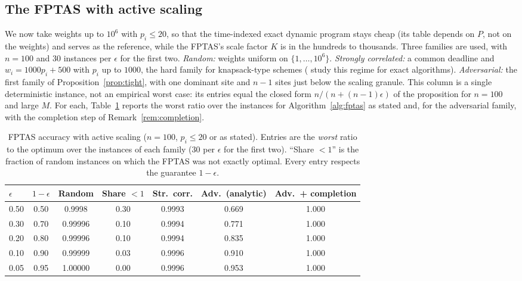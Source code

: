 \documentclass[pdflatex,sn-mathphys-ay]{sn-jnl}
\theoremstyle{thmstyleone}
\theoremstyle{thmstyletwo}
\theoremstyle{thmstylethree}
\begin{document}
\subsection{The FPTAS with active scaling}\label{sec:scaling}

We now take weights up to $10^6$ with $p_i\le20$, so that the
time-indexed exact dynamic program stays cheap (its table depends on
$P$, not on the weights) and serves as the reference, while the
FPTAS's scale factor $K$ is in the hundreds to thousands. Three
families are used, with $n=100$ and $30$ instances per $\epsilon$ for
the first two. \emph{Random:} weights uniform on $\{1,\dots,10^6\}$.
\emph{Strongly correlated:} a common deadline and $w_i=1000p_i+500$ with
$p_i$ up to $1000$, the hard family for knapsack-type schemes
(\citealp{hejl2022} study this regime for exact algorithms).
\emph{Adversarial:} the first family of Proposition~\ref{prop:tight}, with
one dominant site and $n-1$ sites just below the scaling granule. This
column is a single deterministic instance, not an empirical worst case: its
entries equal the closed form $n/(n+(n-1)\epsilon)$ of the proposition for
$n=100$ and large $M$. For each, Table~\ref{tab:scaling} reports the worst ratio over the instances
for Algorithm~\ref{alg:fptas} as stated and, for the adversarial family,
with the completion step of Remark~\ref{rem:completion}.

\begin{table}[h]
\caption{FPTAS accuracy with active scaling ($n=100$, $p_i\le20$ or as
stated). Entries are the \emph{worst} ratio to the optimum over the
instances of each family ($30$ per $\epsilon$ for the first two). ``Share $<1$''
is the fraction of random instances on which the FPTAS was not exactly
optimal. Every entry respects the guarantee $1-\epsilon$.}\label{tab:scaling}
\small
\begin{tabular}{@{}lcccccc@{}}
\toprule
$\epsilon$ & $1-\epsilon$ & Random & Share $<1$ & Str.\ corr. & Adv.\ (analytic) & Adv.\ + completion \\
\midrule
0.50 & 0.50 & 0.9998 & 0.30 & 0.9993 & 0.669 & 1.000 \\
0.30 & 0.70 & 0.99996 & 0.10 & 0.9994 & 0.771 & 1.000 \\
0.20 & 0.80 & 0.99996 & 0.10 & 0.9994 & 0.835 & 1.000 \\
0.10 & 0.90 & 0.99999 & 0.03 & 0.9996 & 0.910 & 1.000 \\
0.05 & 0.95 & 1.00000 & 0.00 & 0.9996 & 0.953 & 1.000 \\
\bottomrule
\end{tabular}
\end{table}
\end{document}
